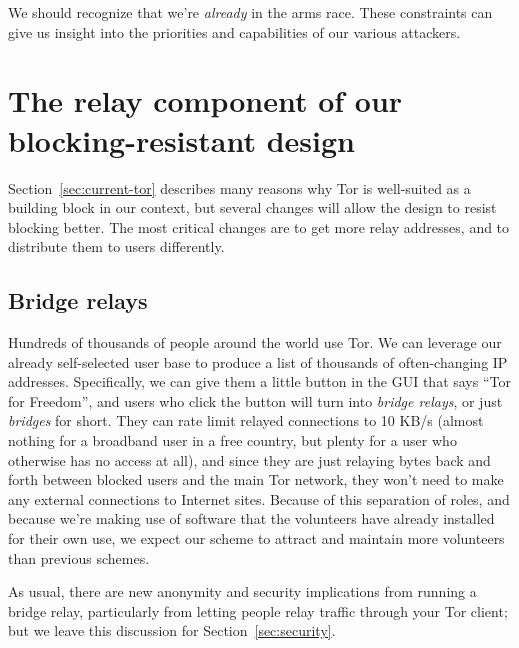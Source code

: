 \documentclass{llncs}
\begin{document}
We should recognize that we're \emph{already} in the arms race. These
constraints can give us insight into the priorities and capabilities of
our various attackers.

\section{The relay component of our blocking-resistant design}
\label{sec:bridges}

Section~\ref{sec:current-tor} describes many reasons why Tor is
well-suited as a building block in our context, but several changes will
allow the design to resist blocking better. The most critical changes are
to get more relay addresses, and to distribute them to users differently.



\subsection{Bridge relays}

Hundreds of thousands of people around the world use Tor. We can leverage
our already self-selected user base to produce a list of thousands of
often-changing IP addresses. Specifically, we can give them a little
button in the GUI that says ``Tor for Freedom'', and users who click
the button will turn into \emph{bridge relays}, or just \emph{bridges}
for short. They can rate limit relayed connections to 10 KB/s (almost
nothing for a broadband user in a free country, but plenty for a user
who otherwise has no access at all), and since they are just relaying
bytes back and forth between blocked users and the main Tor network, they
won't need to make any external connections to Internet sites. Because
of this separation of roles, and because we're making use of software
that the volunteers have already installed for their own use, we expect
our scheme to attract and maintain more volunteers than previous schemes.

As usual, there are new anonymity and security implications from running a
bridge relay, particularly from letting people relay traffic through your
Tor client; but we leave this discussion for Section~\ref{sec:security}.

\end{document}
